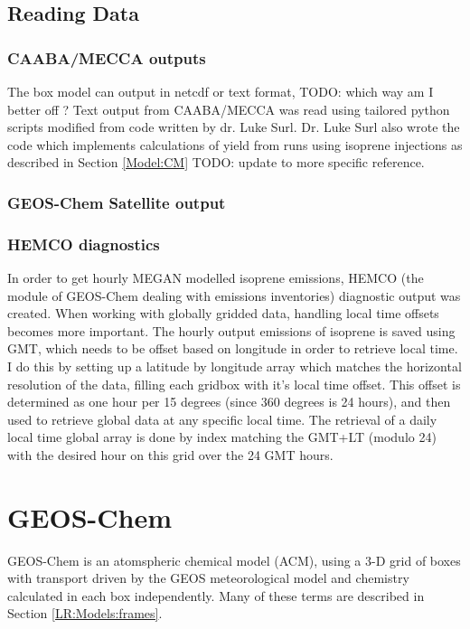   \subsection{Reading Data}
    \subsubsection{CAABA/MECCA outputs}
      The box model can output in netcdf or text format, TODO: which way am I better off ? 
      Text output from CAABA/MECCA was read using tailored python scripts modified from code written by dr. Luke Surl.
      Dr. Luke Surl also wrote the code which implements calculations of yield from runs using isoprene injections as described in Section \ref{Model:CM} TODO: update to more specific reference.
      
    \subsubsection{GEOS-Chem Satellite output}
    
    \subsubsection{HEMCO diagnostics}
      
      In order to get hourly MEGAN modelled isoprene emissions, HEMCO (the module of GEOS-Chem dealing with emissions inventories) diagnostic output was created.
      When working with globally gridded data, handling local time offsets becomes more important.
      The hourly output emissions of isoprene is saved using GMT, which needs to be offset based on longitude in order to retrieve local time.
      I do this by setting up a latitude by longitude array which matches the horizontal resolution of the data, filling each gridbox with it's local time offset.
      This offset is determined as one hour per 15 degrees (since 360 degrees is 24 hours), and then used to retrieve global data at any specific local time.
      The retrieval of a daily local time global array is done by index matching the GMT+LT (modulo 24) with the desired hour on this grid over the 24 GMT hours.
    
\section{GEOS-Chem}
  \label{Model:GC}
  GEOS-Chem is an atomspheric chemical model (ACM), using a 3-D grid of boxes with transport driven by the GEOS meteorological model and chemistry calculated in each box independently. 
  Many of these terms are described in Section \ref{LR:Models:frames}.
  
